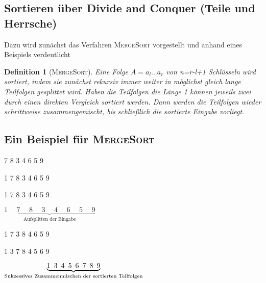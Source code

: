 \documentclass[ngerman]{scrreprt}%
\theoremstyle{break}
\newtheorem{definition}{Definition}
\begin{document}
\subsection{Sortieren über Divide and Conquer (Teile und Herrsche)}
%
%
Dazu wird zunächst das Verfahren \textsc{MergeSort} vorgestellt und anhand eines Beispiels verdeutlicht
\begin{definition}[\textsc{MergeSort}]
        Eine Folge $A=a_l\ldots a_r$ von n=r-l+1 Schlüsseln wird sortiert, indem sie zunächst rekursiv immer weiter
	in möglichst gleich lange Teilfolgen gesplittet wird. Haben die Teilfolgen die Länge 1 können jeweils zwei durch einen direkten
	Vergleich sortiert werden. Dann werden die Teilfolgen wieder schrittweise zusammengemischt, bis schließlich die sortierte Eingabe
	vorliegt. 
\end{definition}

\subsection{Ein Beispiel für \textsc{MergeSort}}

 7 8 3 4 6 5 9
\medskip

1 7 8 3 \hspace{10pt} 4 6 5 9
\medskip

1 7 \hspace{10pt} 8 3 \hspace{10pt} 4 6 \hspace{10pt} 5 9
\medskip

$\underbrace{1 \hspace{15pt} 7 \hspace{15pt} 8 \hspace{15pt} 3 \hspace{15pt} 4 \hspace{15pt} 6 \hspace{15pt} 5 \hspace{15pt}
9}_{\text{Aufsplitten der Eingabe}}$
\medskip

1 7 \hspace{10pt} 3 8 \hspace{10pt} 4 6 \hspace{10pt} 5 9
\medskip

1 3 7 8 \hspace{10pt} 4 5 6 9
\medskip

$\underbrace{1 \hspace{5pt} 3 \hspace{5pt} 4 \hspace{5pt} 5 \hspace{5pt} 6 \hspace{5pt} 7 \hspace{5pt} 8 \hspace{5pt}
9}_{\textrm{\textup{Sukzessives Zusammenmischen der sortierten Teilfolgen}}}$
\end{document}
